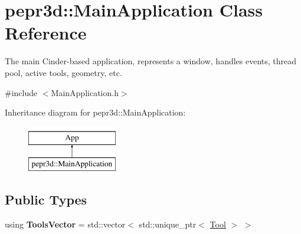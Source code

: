 \hypertarget{classpepr3d_1_1_main_application}{}\section{pepr3d\+::Main\+Application Class Reference}
\label{classpepr3d_1_1_main_application}


The main Cinder-\/based application, represents a window, handles events, thread pool, active tools, geometry, etc.  




{\ttfamily \#include $<$Main\+Application.\+h$>$}

Inheritance diagram for pepr3d\+::Main\+Application\+:\begin{figure}[H]
\begin{center}
\leavevmode
\includegraphics[height=2.000000cm]{classpepr3d_1_1_main_application}
\end{center}
\end{figure}
\subsection*{Public Types}
\begin{DoxyCompactItemize}
\item 
\mbox{\label{classpepr3d_1_1_main_application_a99845ed56d376246abd66dd2ac04e25b}} 
using {\bfseries Tools\+Vector} = std\+::vector$<$ std\+::unique\+\_\+ptr$<$ \mbox{\hyperlink{classpepr3d_1_1_tool}{Tool}} $>$ $>$
\end{DoxyCompactItemize}
